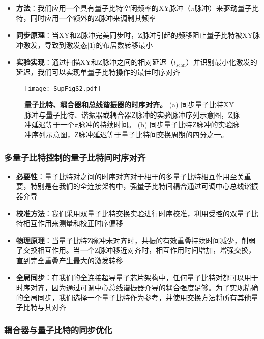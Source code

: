 \documentclass[11pt,a4paper]{article}
\begin{document}
\begin{itemize}
    \item \textbf{方法}：我们应用一个具有量子比特空闲频率的XY脉冲（$\pi$脉冲）来驱动量子比特，同时应用一个额外的Z脉冲来调制其频率
    \item \textbf{同步原理}：当XY和Z脉冲完美同步时，Z脉冲引起的频移阻止量子比特被XY脉冲激发，导致到激发态$|1\rangle$的布居数转移最小
    \item \textbf{实验实现}：通过扫描XY和Z脉冲之间的相对延迟（$t_{\text{scan}}$）并识别最小化激发的延迟，我们可以实现单量子比特操作的最佳时序对齐
\end{itemize}

\begin{figure}[H]
    \centering
    \texttt{[image: SupFigS2.pdf]}
    \caption{
        \textbf{量子比特、耦合器和总线谐振器的时序对齐。}
        (a) 同步量子比特XY脉冲与量子比特、谐振器或耦合器Z脉冲的实验脉冲序列示意图，Z脉冲延迟等于一个$\pi$脉冲的持续时间。
        (b) 同步量子比特Z脉冲的实验脉冲序列示意图，Z脉冲延迟等于量子比特间交换周期的四分之一。
    }
    \label{fig:timing_alignment}
\end{figure}

\subsubsection{多量子比特控制的量子比特间时序对齐}

\begin{itemize}
    \item \textbf{必要性}：量子比特对之间的时序对齐对于相干的多量子比特相互作用至关重要，特别是在我们的全连接架构中，强量子比特间耦合通过可调中心总线谐振器介导
    \item \textbf{校准方法}：我们采用双量子比特交换实验进行时序校准，利用受控的双量子比特相互作用来测量和校正时序偏移
    \item \textbf{物理原理}：当量子比特Z脉冲未对齐时，共振的有效重叠持续时间减少，削弱了交换相互作用。当一个Z脉冲移近对齐时，相互作用时间增加，增强交换，直到完全重叠产生最大的激发转移
    \item \textbf{全局同步}：在我们的全连接超导量子芯片架构中，任何量子比特对都可以用于时序对齐，因为通过可调中心总线谐振器介导的耦合强度足够。为了实现精确的全局同步，我们选择一个量子比特作为参考，并使用交换方法将所有其他量子比特与其对齐
\end{itemize}

\subsubsection{耦合器与量子比特的同步优化}
\end{document}
